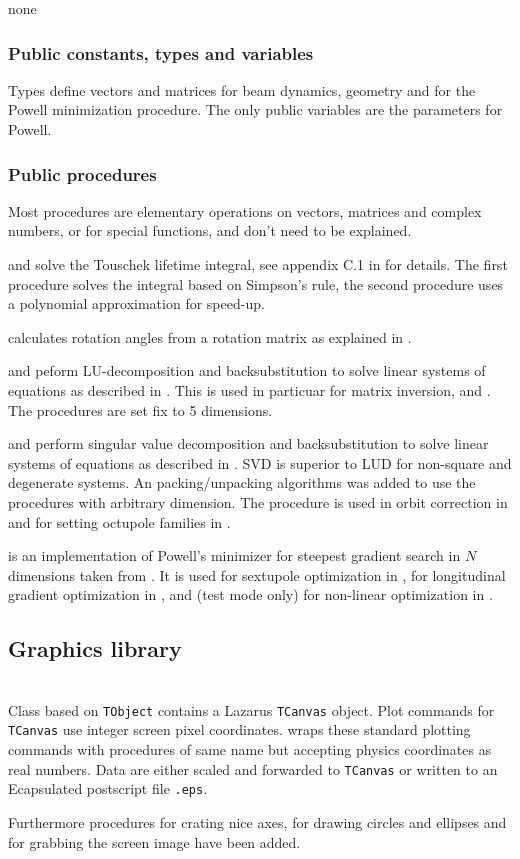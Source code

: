 \documentclass[12pt]{article}
\newcommand\code[1]{{\tt #1}}
\newcommand{\unico}[1]{{\color{burntorange}\code{#1}}}
\newcommand{\opagui}[1]{\colorbox{blue!20}{{\color{black}\code{#1}}}}
\newcommand{\ogui}[1]{\hyperref[#1]{\opagui{#1}}}
\newcommand{\opauni}[1]{\colorbox{orange!30}{{\color{black}\code{#1}}}}
\newcommand{\ounih}[2]{\subsection{\label{#2}#1}{\Huge\opauni{#2}}\\}
\newcommand{\ouni}[1]{\hyperref[#1]{\opauni{#1}}}
\newcommand{\uses}[1]{\flushleft {\bf Uses:} #1}
\newcommand{\desc}[1]{#1}
\newcommand{\pvar}[1]{\subsubsection*{Public constants, types and variables} #1}
\newcommand{\ppro}[1]{\subsubsection*{Public procedures} #1}
\begin{document}
\uses{none}

\pvar{
Types define vectors and matrices for beam dynamics, geometry and for the Powell minimization procedure. The only public variables are the parameters for Powell. 
}

\ppro{
Most procedures are elementary operations on vectors, matrices and complex numbers, or for special functions, and don't need to be explained.

\unico{CTouschek} and \unico{CTouschek\_pol} solve the Touschek lifetime integral, see appendix C.1 in \cite{inside} for details. The first procedure solves the integral based on Simpson's rule, the second procedure uses a polynomial approximation for speed-up. 

\unico{EulerAng} calculates rotation angles from a rotation matrix as explained in \cite{euler}.

\unico{LUDCMP} and \unico{LUBKSB} peform LU-decomposition and backsubstitution to solve linear systems of equations as described in \cite{numrec}. This is used in particuar for matrix inversion, \unico{MatInv} and \unico{MatDet}. The procedures are set fix to 5 dimensions.

\unico{svdcmp} and \unico{svbksb} perform singular value decomposition and backsubstitution to solve linear systems of equations as described in \cite{numrec}. SVD is superior to LUD for non-square and degenerate systems. An packing/unpacking algorithms was added to use the procedures with arbitrary dimension. The procedure is used in orbit correction in \ogui{opaorbit} and for setting octupole families in \ogui{opachroma}.

\unico{Powell} is an implementation of Powell's minimizer for steepest gradient search in $N$ dimensions taken from \cite{numrec}. It is used for sextupole optimization in \ogui{opachroma}, for longitudinal gradient optimization in \ogui{opalgbedit}, and (test mode only) for non-linear optimization in \ogui{opamomentum}.
}



\ounih{Graphics library}{comvgraphlib}

\desc{
Class \unico{Vplot} based on \code{TObject} contains a Lazarus \code{TCanvas} object. Plot commands for \code{TCanvas}  use integer screen pixel coordinates. \ouni{comvgraphlib} wraps these standard plotting commands with procedures of same name but accepting physics coordinates as real numbers. Data are either scaled and forwarded to \code{TCanvas}  or written to an Ecapsulated postscript file \code{*.eps}.

Furthermore procedures for crating nice axes, for drawing circles and ellipses and for grabbing the screen image have been added.
}
\end{document}
